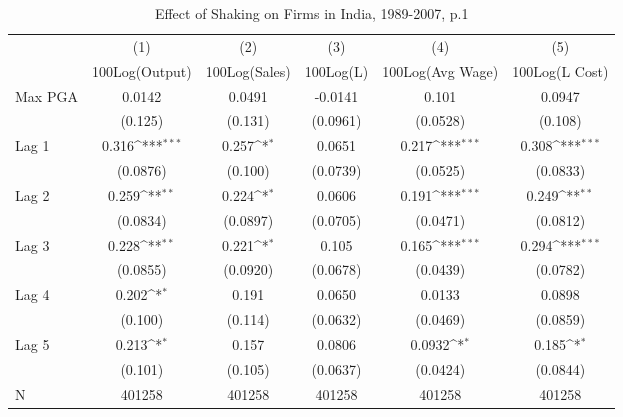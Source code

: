 \begin{table}[htbp]\centering
\def\sym#1{\ifmmode^{#1}\else\(^{#1}\)\fi}
\caption{Effect of Shaking on Firms in India, 1989-2007, p.1}
\begin{tabular}{l*{5}{c}}
\toprule
                &\multicolumn{1}{c}{(1)}&\multicolumn{1}{c}{(2)}&\multicolumn{1}{c}{(3)}&\multicolumn{1}{c}{(4)}&\multicolumn{1}{c}{(5)}\\
                &\multicolumn{1}{c}{100Log(Output)}&\multicolumn{1}{c}{100Log(Sales)}&\multicolumn{1}{c}{100Log(L)}&\multicolumn{1}{c}{100Log(Avg Wage)}&\multicolumn{1}{c}{100Log(L Cost)}\\
\midrule
Max PGA         &   0.0142         &   0.0491         &  -0.0141         &    0.101         &   0.0947         \\
                &  (0.125)         &  (0.131)         & (0.0961)         & (0.0528)         &  (0.108)         \\
\addlinespace
Lag 1           &    0.316\sym{***}&    0.257\sym{*}  &   0.0651         &    0.217\sym{***}&    0.308\sym{***}\\
                & (0.0876)         &  (0.100)         & (0.0739)         & (0.0525)         & (0.0833)         \\
\addlinespace
Lag 2           &    0.259\sym{**} &    0.224\sym{*}  &   0.0606         &    0.191\sym{***}&    0.249\sym{**} \\
                & (0.0834)         & (0.0897)         & (0.0705)         & (0.0471)         & (0.0812)         \\
\addlinespace
Lag 3           &    0.228\sym{**} &    0.221\sym{*}  &    0.105         &    0.165\sym{***}&    0.294\sym{***}\\
                & (0.0855)         & (0.0920)         & (0.0678)         & (0.0439)         & (0.0782)         \\
\addlinespace
Lag 4           &    0.202\sym{*}  &    0.191         &   0.0650         &   0.0133         &   0.0898         \\
                &  (0.100)         &  (0.114)         & (0.0632)         & (0.0469)         & (0.0859)         \\
\addlinespace
Lag 5           &    0.213\sym{*}  &    0.157         &   0.0806         &   0.0932\sym{*}  &    0.185\sym{*}  \\
                &  (0.101)         &  (0.105)         & (0.0637)         & (0.0424)         & (0.0844)         \\
\midrule
N               &   401258         &   401258         &   401258         &   401258         &   401258         \\

\end{tabular}
\end{table}
